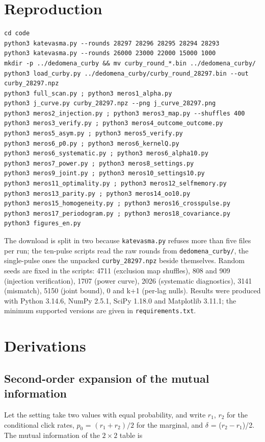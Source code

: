 \documentclass[
  11pt,
]{article}
\begin{document}
\section{Reproduction}

\begin{verbatim}
cd code
python3 katevasma.py --rounds 28297 28296 28295 28294 28293
python3 katevasma.py --rounds 26000 23000 22000 15000 1000
mkdir -p ../dedomena_curby && mv curby_round_*.bin ../dedomena_curby/
python3 load_curby.py ../dedomena_curby/curby_round_28297.bin --out curby_28297.npz
python3 full_scan.py ; python3 meros1_alpha.py
python3 j_curve.py curby_28297.npz --png j_curve_28297.png
python3 meros2_injection.py ; python3 meros3_map.py --shuffles 400
python3 meros3_verify.py ; python3 meros4_outcome_outcome.py
python3 meros5_asym.py ; python3 meros5_verify.py
python3 meros6_p0.py ; python3 meros6_kernelQ.py
python3 meros6_systematic.py ; python3 meros6_alpha10.py
python3 meros7_power.py ; python3 meros8_settings.py
python3 meros9_joint.py ; python3 meros10_settings10.py
python3 meros11_optimality.py ; python3 meros12_selfmemory.py
python3 meros13_parity.py ; python3 meros14_oo10.py
python3 meros15_homogeneity.py ; python3 meros16_crosspulse.py
python3 meros17_periodogram.py ; python3 meros18_covariance.py
python3 figures_en.py
\end{verbatim}

The download is split in two because \texttt{katevasma.py} refuses more
than five files per run; the ten-pulse scripts read the raw rounds from
\texttt{dedomena\_curby/}, the single-pulse ones the unpacked
\texttt{curby\_28297.npz} beside themselves. Random seeds are fixed in
the scripts: 4711 (exclusion map shuffles), 808 and 909 (injection
verification), 1707 (power curve), 2026 (systematic diagnostics), 3141
(mismatch), 5150 (joint bound), 0 and \textbar k\textbar+1 (per-lag
nulls). Results were produced with Python 3.14.6, NumPy 2.5.1, SciPy
1.18.0 and Matplotlib 3.11.1; the minimum supported versions are given
in \texttt{requirements.txt}.

\section{Derivations}

\subsection{Second-order expansion of the mutual information}

Let the setting take two values with equal probability, and write
\(r_{1}\), \(r_{2}\) for the conditional click rates, \(p_{0}\) =
\((r_1+r_2)/2\) for the marginal, and \(\delta\) =
(\(r_{2} - r_{1}\))/2. The mutual information of the \(2\times2\) table
is
\end{document}
